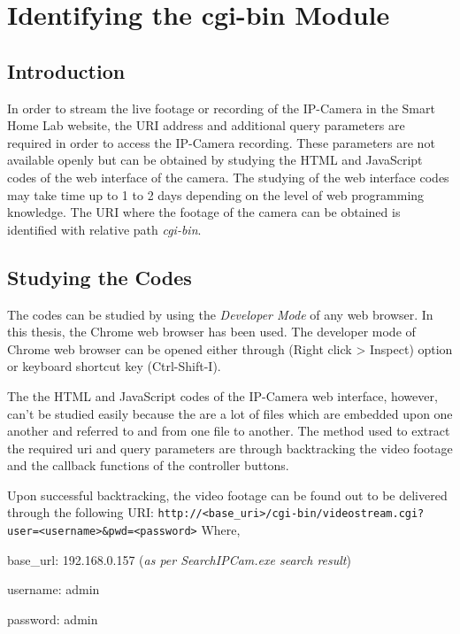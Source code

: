 \section{Identifying the cgi-bin Module}
\subsection{Introduction}
In order to stream the live footage or recording of the IP-Camera in the Smart Home Lab website, the URI address and additional query parameters are required in order to access the IP-Camera recording. These parameters are not available openly but can be obtained by studying the HTML and JavaScript codes of the web interface of the camera. The studying of the web interface codes may take time up to 1 to 2 days depending on the level of web programming knowledge. The URI where the footage of the camera can be obtained is identified with relative path \emph{cgi-bin}.

\subsection{Studying the Codes}\label{sec:cctv-studying-the-codes}
The codes can be studied by using the \emph{Developer Mode} of any web browser. In this thesis, the Chrome web browser has been used. The developer mode of Chrome web browser can be opened either through (Right click {\textgreater} Inspect) option or keyboard shortcut key (Ctrl-Shift-I).

The the HTML and JavaScript codes of the IP-Camera web interface, however, can't be studied easily because the are a lot of files which are embedded upon one another and referred to and from one file to another. The method used to extract the required \ac{uri} and query parameters are through backtracking the video footage and the callback functions of the controller buttons.

Upon successful backtracking, the video footage can be found out to be delivered through the following URI:
\newline
\texttt{\footnotesize{http://\textless base\_uri\textgreater/cgi-bin/videostream.cgi?user=\textless username\textgreater\&pwd=\textless password\textgreater}}
\newline
Where,
\begin{itemize*}
\item base\_url: 192.168.0.157 (\emph{as per SearchIPCam.exe search result})
\item username: admin
\item password: admin
\end{itemize*}

